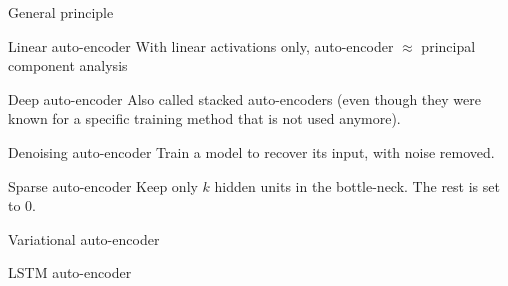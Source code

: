 \begin{frame}{General principle}
\end{frame}

\begin{frame}{Linear auto-encoder}
  With linear activations only, auto-encoder $\approx$ principal component analysis

\end{frame}

\begin{frame}{Deep auto-encoder}
  Also called stacked auto-encoders (even though they were known for a specific training method that is not used anymore).

\end{frame}

\begin{frame}{Denoising auto-encoder}
  Train a model to recover its input, with noise removed.

\end{frame}

\begin{frame}{Sparse auto-encoder}
  Keep only $k$ hidden units in the bottle-neck. The rest is set to 0.

\end{frame}

\begin{frame}{Variational auto-encoder}
\end{frame}

\begin{frame}{LSTM auto-encoder}
\end{frame}
